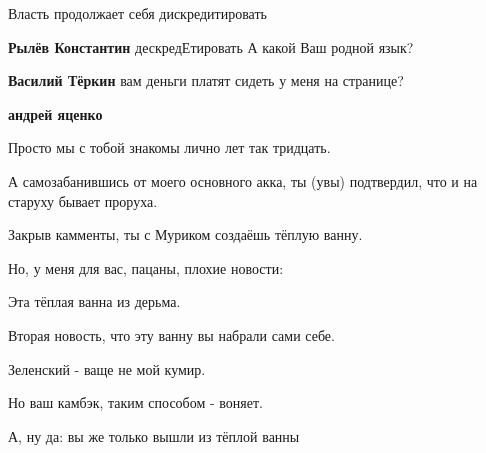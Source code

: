 \begin{itemize}
\begin{itemize}
\end{itemize}

 
Власть продолжает себя дискредитировать

\begin{itemize}
 
\textbf{Рылёв Константин}
дескредЕтировать
А какой Ваш родной язык?

 
\textbf{Василий Тёркин} вам деньги платят сидеть у меня на странице?

 
\textbf{андрей яценко}

Просто мы с тобой знакомы лично лет так тридцать.

А самозабанившись от моего основного акка, ты (увы) подтвердил, что и на
старуху бывает проруха.

Закрыв камменты, ты с Муриком создаёшь тёплую ванну.

Но, у меня для вас, пацаны, плохие новости:

Эта тёплая ванна из дерьма.

Вторая новость, что эту ванну вы набрали сами себе.

Зеленский - ваще не мой кумир.

Но ваш камбэк, таким способом - воняет.

А, ну да: вы же только вышли из тёплой ванны

 

\end{itemize}
\end{itemize}
